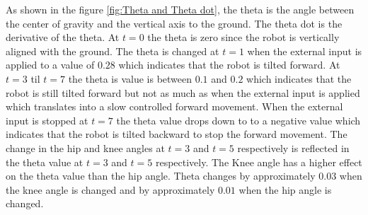 As shown in the figure \ref{fig:Theta and Theta dot}, the theta is the angle between the center of gravity and the vertical axis to the ground. The theta dot is the derivative of the theta. At $t=0$ the theta is zero since the robot is vertically aligned with the ground. The theta is changed at $t=1$ when the external input is applied to a value of $0.28$ which indicates that the robot is tilted forward. At $t=3$ til $t=7$ the theta is value is between $0.1$ and $0.2$ which indicates that the robot is still tilted forward but not as much as when the external input is applied which translates into a slow controlled forward movement. When the external input is stopped at $t=7$ the theta value drops down to to a negative value which indicates that the robot is tilted backward to stop the forward movement. The change in the hip and knee angles at $t=3$ and $t=5$ respectively is reflected in the theta value at $t=3$ and $t=5$ respectively. The Knee angle has a higher effect on the theta value than the hip angle. Theta changes by approximately $0.03$ when the knee angle is changed and by approximately $0.01$ when the hip angle is changed.

